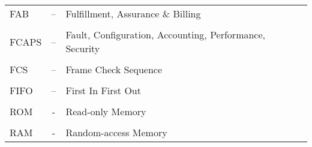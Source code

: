 \begin{tabular}{ l c l }
	\\
	FAB & – \hspace{1cm} & Fulfillment, Assurance \& Billing \\
	\\
	FCAPS & – \hspace{1cm} & Fault, Configuration, Accounting, Performance, Security \\
	\\
	FCS & – \hspace{1cm} & Frame Check Sequence \\
	\\
	FIFO & – \hspace{1cm} & First In First Out \\
	\\
	ROM & - \hspace{1cm} & Read-only Memory \\
	\\
	RAM & - \hspace{1cm} & Random-access Memory \\
\end{tabular}
